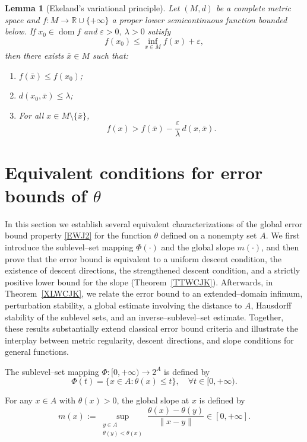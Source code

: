 \documentclass[11pt]{article}
\newtheorem{lemma}{Lemma}[section]
\begin{document}
\begin{lemma}[Ekeland's variational principle]\label{ELdaz}
	Let $(M, d)$ be a complete metric space and $f: M \to \mathbb{R} \cup \{+\infty\}$ a proper lower semicontinuous function bounded below. If $x_0 \in \operatorname{dom} f$ and $\varepsilon > 0,\ \lambda > 0$ satisfy
	\[
	f(x_0) \le \inf_{x \in M} f(x) + \varepsilon,
	\]
	then there exists $\bar{x} \in M$ such that:
	\begin{enumerate}
		\item $f(\bar{x}) \le f(x_0)$;
		\item $d(x_0, \bar{x}) \le \lambda$;
		\item For all $x \in M \setminus \{\bar{x}\}$,
		\[
		f(x) > f(\bar{x}) - \frac{\varepsilon}{\lambda} \, d(x, \bar{x}) .
		\]
	\end{enumerate}
\end{lemma}


\section{Equivalent  conditions  for   error  bounds of \(\theta\)} 


In this section we establish several equivalent characterizations of the global error bound property \eqref{EWJ2} for the function \(\theta\) defined on a nonempty set \(A\).  
We first introduce the sublevel–set mapping \(\Phi(\cdot)\) and the global slope \(m(\cdot)\), and then prove that the error bound is equivalent to a uniform descent condition, the existence of descent directions,  the strengthened descent    condition,  and a strictly positive lower bound for the slope (Theorem~\ref{TTWCJK}).  
Afterwards, in Theorem~\ref{XLWCJK}, we relate the error bound to an extended–domain infimum, perturbation stability, a global estimate involving the distance to \(A\), Hausdorff stability of the sublevel sets, and an inverse–sublevel–set estimate.  
Together, these results substantially extend classical error bound criteria and illustrate the interplay between metric regularity, descent directions, and slope conditions for general   functions.

The  sublevel–set mapping $\Phi:[0,+\infty)\to   2^A$ is defined by
$$\Phi(t)=\{x\in A:\theta(x)\le t\}, \quad  \forall t \in [0,+\infty).$$

For any \(x\in A\) with \(\theta(x)>0\),  the  global slope at \(x\) is defined by
\[
m(x):=\sup_{\substack{y\in A\\ \theta(y)<\theta(x)}}\frac{\theta(x)-\theta(y)}{\|x-y\|}\in[0,+\infty].
\]
\end{document}
